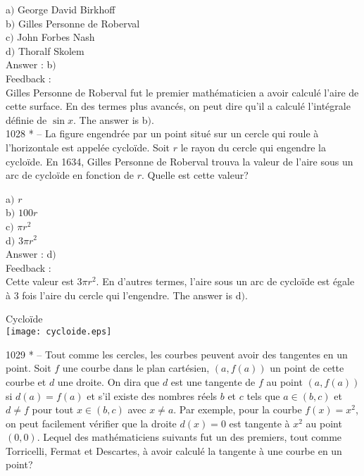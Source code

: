 \documentclass[letterpaper, 12pt]{article}
\begin{document}
a$)$ George David Birkhoff  \\
b$)$ Gilles Personne de Roberval \\
c$)$ John Forbes Nash  \\
d$)$ Thoralf Skolem\\

Answer : b$)$\\

Feedback :\\
Gilles Personne de Roberval fut le premier math\'ematicien a avoir
calcul\'e l'aire de cette surface. En des termes plus avanc\'es, on
peut dire qu'il a calcul\'e l'int\'egrale d\'efinie de $\sin x$.
The answer is b$)$.\\

1028 * -- La figure engendr\'ee par un point situ\'e sur un cercle
qui roule \`a l'horizontale est appel\'ee cyclo\"ide. Soit $r$ le
rayon du cercle qui engendre la cyclo\"ide. En 1634, Gilles Personne
de Roberval trouva la valeur de l'aire sous un arc de cyclo\"ide en
fonction de $r$. Quelle est cette valeur?

a$)$ $r$  \\
b$)$ $100r$ \\
c$)$ $\pi r^2$  \\
d$)$ $3\pi r^2$ \\

Answer : d$)$\\

Feedback :\\
Cette valeur est $3\pi r^2$. En d'autres termes, l'aire sous un arc
de cyclo\"ide est \'egale \`a 3 fois l'aire du cercle qui
l'engendre.
The answer is d$)$.\\

        \begin{center}
Cyclo\"ide        \\
    \texttt{[image: cycloide.eps]}\\
    \end{center}

1029 * -- Tout comme les cercles, les courbes peuvent avoir des
tangentes en un point. Soit $f$ une courbe dans le plan cart\'esien,
$(a,f(a))$ un point de cette courbe et $d$ une droite. On dira que
$d$ est une tangente de $f$ au point $(a,f(a))$ si $d(a)=f(a)$ et
s'il existe des nombres r\'eels $b$ et $c$ tels que $a\in(b,c)$ et
$d\not=f$ pour tout $x\in(b,c)$ avec $x\not=a$. Par exemple, pour la
courbe $f(x)=x^2$, on peut facilement v\'erifier que la droite
$d(x)=0$ est tangente \`a $x^2$ au point $(0,0)$. Lequel des
math\'ematiciens suivants fut un des premiers, tout comme
Torricelli, Fermat et Descartes, \`a avoir calcul\'e la tangente \`a
une courbe en un point?
\end{document}
